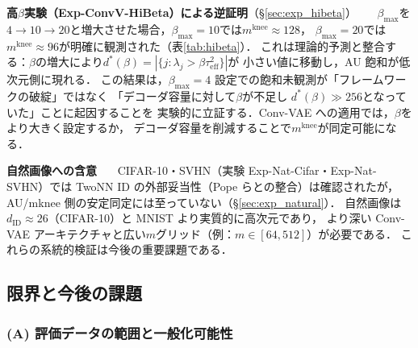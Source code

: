 \documentclass[11pt,a4paper]{jsarticle}
\newcommand{\mknee}{m^{\mathrm{knee}}}
\begin{document}
\textbf{高$\beta$実験（Exp-ConvV-HiBeta）による逆証明}（§\ref{sec:exp_hibeta}）~~~
$\beta_{\max}$を$4\to10\to20$と増大させた場合，$\beta_{\max}=10$では$\mknee \approx 128$，
$\beta_{\max}=20$では$\mknee \approx 96$が明確に観測された（表\ref{tab:hibeta}）．
これは理論的予測と整合する：$\beta$の増大により$d^*(\beta) = |\{j: \lambda_j > \beta\tau^2_\mathrm{eff}\}|$が
小さい値に移動し，AU 飽和が低次元側に現れる．
この結果は，$\beta_{\max}=4$ 設定での飽和未観測が「フレームワークの破綻」ではなく
「デコーダ容量に対して$\beta$が不足し $d^*(\beta) \gg 256$となっていた」ことに起因することを
実験的に立証する．Conv-VAE への適用では，$\beta$をより大きく設定するか，
デコーダ容量を削減することで$\mknee$が同定可能になる．


\textbf{自然画像への含意}~~~
CIFAR-10・SVHN（実験 Exp-Nat-Cifar・Exp-Nat-SVHN）では TwoNN ID の外部妥当性（Pope ら\cite{pope2021intrinsic}との整合）は確認されたが，
AU/mknee 側の安定同定には至っていない（§\ref{sec:exp_natural}）．
自然画像は$d_\mathrm{ID} \approx 26$（CIFAR-10）と MNIST より実質的に高次元であり，
より深い Conv-VAE アーキテクチャと広い$m$グリッド（例：$m \in [64, 512]$）が必要である．
これらの系統的検証は今後の重要課題である．

\subsection{限界と今後の課題}\label{sec:disc_limitation}

\subsubsection*{(A) 評価データの範囲と一般化可能性}
\end{document}
